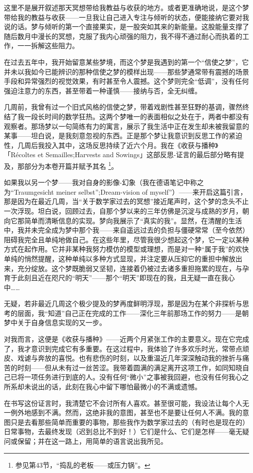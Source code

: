 这里不是展开叙述那天冥想带给我教益与收获的地方。或者更准确地说，是这个梦带给我的教益与收获——一旦我让自己进入专注与倾听的状态，便能接纳它要对我说的话。梦与倾听的第一个直接果实，是一股突如其来的新能量。这股能量支撑了随后数月中漫长的冥想，克服了我内心顽强的阻力，我不得不通过耐心而执着的工作，一一拆解这些阻力。

在过去五年中，我开始留意某些梦境，而这个梦是我遇到的第一个“信使之梦”，它并未以我如今已能辨识的那种信使之梦的模样出现——那些梦通常带有震撼的场景手段和异常强烈的视觉效果，有时甚至令人震撼。这个梦则完全“低调”，没有任何强迫注意力的东西，甚至带着一种谨慎——接纳与否，全无纠缠。

几周前，我曾有过一个旧式风格的信使之梦，带着戏剧性甚至狂野的基调，骤然终结了我一段长时间的数学狂热。这两个梦唯一的表面相似之处在于，两者中都没有观察者。那场梦以一句简练有力的寓言，展示了我生活中正在发生却未被我留意的某事——坦白说，是我刻意忽视的东西。正是那个梦让我意识到反思工作的紧迫性，几周后我投入其中，这场反思持续了近六个月。我在《收获与播种》「Récoltes et Semailles;Harvests and Sowings」这部反思-证言的最后部分略有提及，那部分为本卷开篇并赋予其名 \footnote{参见第43节，“捣乱的老板——或压力锅”。}。

如果我以另一个梦——我对自身的影像-幻象（我在德语笔记中称之为“Traumgesicht meiner selbst”;Dream-vision of myself”）——来开启这篇引言，那是因为在最近几周，当“关于数学家过去的冥想”接近尾声时，这个梦的念头不止一次浮现。坦白说，回顾过去，自那个梦以来的三年仿佛是沉淀与成熟的岁月，朝向它那简单而清晰信息的实现。梦向我展示了“真实的我”。显然，在清醒的生活中，我并未完全成为梦中那个我——来自遥远过去的负担与僵硬常常（至今依然）阻碍我完全且单纯地做自己。在这些年里，尽管我很少想起这个梦，它一定以某种方式在起作用。它并非某种我努力模仿的模型或理想，而是对一种“属于我”的欢快单纯的悄然提醒，这种单纯以多种方式显现，并注定要从压抑它的重担中解放出来，充分绽放。这个梦既脆弱又坚韧，连接着仍被过去诸多重担拖累的现在，与孕育于此刻且近在咫尺的“明天”——那个“明天”即现在的我，且无疑一直在我心中……

无疑，若非最近几周这个极少提及的梦再度鲜明浮现，那是因为在某个非探析与思考的层面，我“知道”自己正在完成的工作——深化三年前那场工作的努力——是朝梦中关于自身信息实现的又一步。

对我而言，这便是《收获与播种》——近两个月紧张工作的主要意义。现在它完成了，我才意识到完成它有多重要。在这过程中，我体验了许多欢乐时光，常带点顽皮、戏谑与奔放的喜悦。也有悲伤的时刻，以及重温近几年深深触动我的挫折与痛苦的时刻——但从未有过一丝苦涩。我带着圆满的满足离开这项工作，如同知晓自己已将一项任务进行到底的人。没有任何“微小”之事被我回避，也没有任何我心之所系却未说出的话，此刻在我心中留下哪怕最微小的不满或遗憾。

在书写这份证言时，我清楚它不会讨所有人喜欢。甚至很可能，我设法让每个人无一例外地感到不满。然而，这绝非我的意图，甚至也不是要让任何人不满。我的意图只是去看那些简单而重要的事物，那些我作为数学家过去的（有时也是现在的）日常事物，去最终发现（迟到总比不到好！）它们是什么、它们是怎样——毫无疑问或保留；并在这一路上，用简单的语言说出我所见。